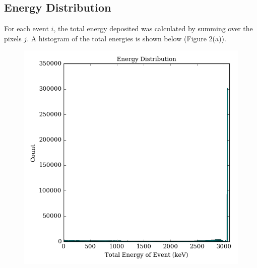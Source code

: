 \documentclass[12pt]{article}
\begin{document}
\subsection{Energy Distribution}

For each event $i$, the total energy deposited was calculated by summing over the pixels $j$. A histogram of the total energies is shown below (Figure 2(a)). 

\begin{center}
\begin{figure}
\includegraphics[scale=0.9]{../figures/energy_distribution.png}


\end{figure}
\end{center}
\end{document}
